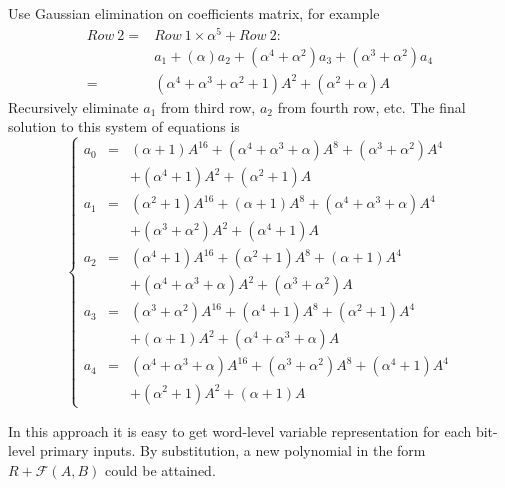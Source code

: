 \begin{Example}
Use Gaussian elimination on coefficients matrix, for example  
\begin{align}
Row\ 2 =& Row\ 1\times \alpha^5 + Row\ 2: \nonumber\\
&a_1+(\alpha)a_2+(\alpha^4+\alpha^2)a_3+(\alpha^3+\alpha^2)a_4\nonumber\\
=&(\alpha^4+\alpha^3+\alpha^2+1)A^2+(\alpha^2+\alpha)A\nonumber
\end{align}
Recursively eliminate $a_1$ from third row, $a_2$ from fourth row, etc. The final solution to this system of
equations is
\begin{displaymath}
\left\{
  \begin{array}{lcl}
  a_0 & = & (\alpha+1)A^{16}+(\alpha^4+\alpha^3+\alpha)A^8+(\alpha^3+\alpha^2)A^4\\&&+(\alpha^4+1)A^2+(\alpha^2+1)A\\
  a_1 & = & (\alpha^2+1)A^{16}+(\alpha+1)A^8+(\alpha^4+\alpha^3+\alpha)A^4\\&&+(\alpha^3+\alpha^2)A^2+(\alpha^4+1)A\\
  a_2 & = & (\alpha^4+1)A^{16}+(\alpha^2+1)A^8+(\alpha+1)A^4\\&&+(\alpha^4+\alpha^3+\alpha)A^2+(\alpha^3+\alpha^2)A\\
  a_3 & = & (\alpha^3+\alpha^2)A^{16}+(\alpha^4+1)A^8+(\alpha^2+1)A^4\\&&+(\alpha+1)A^2+(\alpha^4+\alpha^3+\alpha)A\\
  a_4 & = & (\alpha^4+\alpha^3+\alpha)A^{16}+(\alpha^3+\alpha^2)A^8+(\alpha^4+1)A^4\\&&+(\alpha^2+1)A^2+(\alpha+1)A
  \end{array} \right.
\end{displaymath}
\end{Example}
In this approach it is easy to get word-level variable representation for each bit-level primary inputs. By substitution, a new polynomial in the form $R+\mathcal{F}(A,B)$
could be attained.

